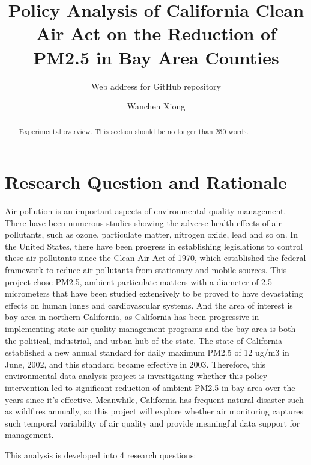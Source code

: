 \documentclass[12pt,]{article}
\title{Policy Analysis of California Clean Air Act on the Reduction of PM2.5 in
Bay Area Counties}
\subtitle{Web address for GitHub repository}
\author{Wanchen Xiong}
\date{}
\begin{document}
\maketitle
\begin{abstract}
Experimental overview. This section should be no longer than 250 words.
\end{abstract}

\newpage

\tableofcontents  \newpage

\section{Research Question and
Rationale}\label{research-question-and-rationale}

Air pollution is an important aspects of environmental quality
management. There have been numerous studies showing the adverse health
effects of air pollutants, such as ozone, particulate matter, nitrogen
oxide, lead and so on. In the United States, there have been progress in
establishing legislations to control these air pollutants since the
Clean Air Act of 1970, which established the federal framework to reduce
air pollutants from stationary and mobile sources. This project chose
PM2.5, ambient particulate matters with a diameter of 2.5 micrometers
that have been studied extensively to be proved to have devastating
effects on human lungs and cardiovascular systems. And the area of
interest is bay area in northern California, as California has been
progressive in implementing state air quality management programs and
the bay area is both the political, industrial, and urban hub of the
state. The state of California established a new annual standard for
daily maximum PM2.5 of 12 ug/m3 in June, 2002, and this standard became
effective in 2003. Therefore, this environmental data analysis project
is investigating whether this policy intervention led to significant
reduction of ambient PM2.5 in bay area over the years since it's
effective. Meanwhile, California has frequent natural disaster such as
wildfires annually, so this project will explore whether air monitoring
captures such temporal variability of air quality and provide meaningful
data support for management.

This analysis is developed into 4 research questions:
\end{document}
